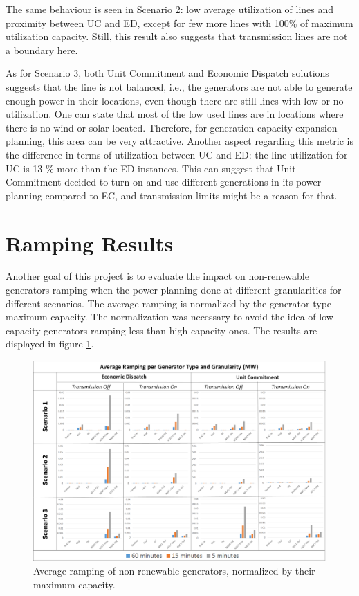 \documentclass[12pt,LUDisStyle,twosided]{book}
\begin{document}
The same behaviour is seen in Scenario 2: low average utilization of lines and proximity between UC and ED, except for few more lines with 100\% of maximum utilization capacity. Still, this result also suggests that transmission lines are not a boundary here.

As for Scenario 3, both Unit Commitment and Economic Dispatch solutions suggests that the line is not balanced, i.e., the generators are not able to generate enough power in their locations, even though there are still lines with low or no utilization. One can state that most of the low used lines are in locations where there is no wind or solar located. Therefore, for generation capacity expansion planning, this area can be very attractive. Another aspect regarding this metric is the difference in terms of utilization between UC and ED: the line utilization for UC is 13 \% more than the ED instances. This can suggest that Unit Commitment decided to turn on and use different generations in its power planning compared to EC, and transmission limits might be a reason for that.

\section{Ramping Results} \label{section:ramping}

Another goal of this project is to evaluate the impact on non-renewable generators ramping when the power planning done at different granularities for different scenarios. The average ramping is normalized by the generator type maximum capacity. The normalization was necessary to avoid the idea of low-capacity generators ramping less than high-capacity ones. The results are displayed in figure  \ref{fig:averageramping}.

\begin{figure}[H] 
  \centering
  
	  \includegraphics[width=\textwidth,height=\textheight,keepaspectratio]{averageRamping.png}
  
  \caption{Average ramping of non-renewable generators, normalized by their maximum capacity.}
  \label{fig:averageramping}
    
\end{figure}
\end{document}
